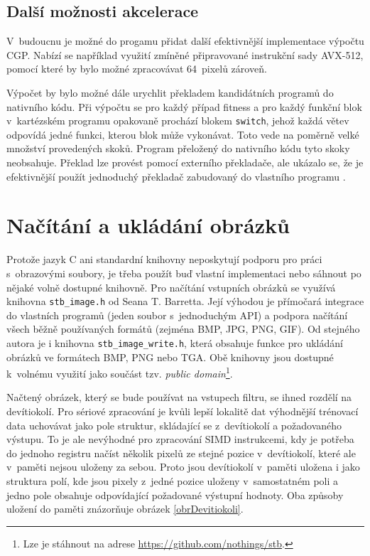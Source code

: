 \subsection{Další možnosti akcelerace}

V~budoucnu je možné do progamu přidat další efektivnější implementace výpočtu CGP. Nabízí se například využití zmíněné připravované instrukční sady AVX-512, pomocí které by bylo možné zpracovávat 64~pixelů zároveň.

Výpočet by bylo možné dále urychlit překladem kandidátních programů do nativního kódu. Při výpočtu se pro každý případ fitness a pro každý funkční blok v~kartézském programu opakovaně prochází blokem \texttt{switch}, jehož každá větev odpovídá jedné funkci, kterou blok může vykonávat. Toto vede na poměrně velké množství provedených skoků.
Program přeložený do nativního kódu tyto skoky neobsahuje. Překlad lze provést pomocí externího překladače, ale ukázalo se, že je efektivnější použít jednoduchý překladač zabudovaný do vlastního programu \cite{VasicekCompiler}.

\section{Načítání a ukládání obrázků}
\label{secImplImages}

Protože jazyk C ani standardní knihovny neposkytují podporu pro práci s~obrazovými soubory, je třeba použít buď vlastní implementaci nebo sáhnout po nějaké volně dostupné knihovně. Pro načítání vstupních obrázků se využívá knihovna \texttt{stb\_image.h} od Seana T. Barretta. Její výhodou je přímočará integrace do vlastních programů (jeden soubor s~jednoduchým API) a podpora načítání všech běžně používaných formátů (zejména BMP, JPG, PNG, GIF). Od stejného autora je i knihovna \texttt{stb\_image\_write.h}, která obsahuje funkce pro ukládání obrázků ve formátech BMP, PNG nebo TGA. Obě knihovny jsou dostupné k~volnému využití jako součást tzv. \emph{public domain}\footnote{Lze je stáhnout na adrese \url{https://github.com/nothings/stb}.}.

Načtený obrázek, který se bude používat na vstupech filtru, se ihned rozdělí na devítiokolí. Pro sériové zpracování je kvůli lepší lokalitě dat výhodnější trénovací data uchovávat jako pole struktur, skládající se z~devítiokolí a požadovaného výstupu. To je ale nevýhodné pro zpracování SIMD instrukcemi, kdy je potřeba do jednoho registru načíst několik pixelů ze stejné pozice v~devítiokolí, které ale v~paměti nejsou uloženy za sebou. Proto jsou devítiokolí v~paměti uložena i jako struktura polí, kde jsou pixely z~jedné pozice uloženy v~samostatném poli a jedno pole obsahuje odpovídající požadované výstupní hodnoty. Oba způsoby uložení do paměti znázorňuje obrázek \ref{obrDevitiokoli}.

